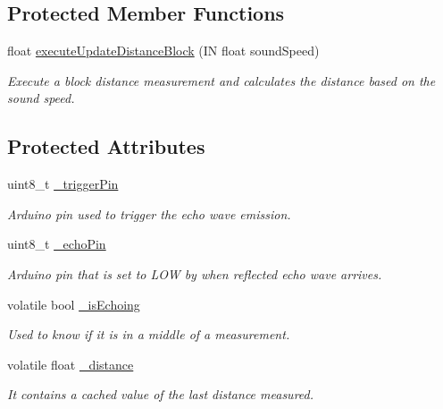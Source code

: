 \subsection*{Protected Member Functions}
\begin{DoxyCompactItemize}
\item 
float \hyperlink{class_easyuino_1_1_distance_meter_a4e02477669d61a3a7afb7deb9c53cf17}{execute\+Update\+Distance\+Block} (IN float sound\+Speed)
\begin{DoxyCompactList}\small\item\em Execute a block distance measurement and calculates the distance based on the sound speed. \end{DoxyCompactList}\end{DoxyCompactItemize}
\subsection*{Protected Attributes}
\begin{DoxyCompactItemize}
\item 
\mbox{\label{class_easyuino_1_1_distance_meter_a39f2305fe998cd3212eef389dfe036fe}} 
uint8\+\_\+t \hyperlink{class_easyuino_1_1_distance_meter_a39f2305fe998cd3212eef389dfe036fe}{\+\_\+trigger\+Pin}
\begin{DoxyCompactList}\small\item\em Arduino pin used to trigger the echo wave emission. \end{DoxyCompactList}\item 
\mbox{\label{class_easyuino_1_1_distance_meter_a6f4a18c48dc147102f1fae8cb12e24a2}} 
uint8\+\_\+t \hyperlink{class_easyuino_1_1_distance_meter_a6f4a18c48dc147102f1fae8cb12e24a2}{\+\_\+echo\+Pin}
\begin{DoxyCompactList}\small\item\em Arduino pin that is set to L\+OW by when reflected echo wave arrives. \end{DoxyCompactList}\item 
\mbox{\label{class_easyuino_1_1_distance_meter_ae2b9e4d3e8704c8f1a73639afd53614d}} 
volatile bool \hyperlink{class_easyuino_1_1_distance_meter_ae2b9e4d3e8704c8f1a73639afd53614d}{\+\_\+is\+Echoing}
\begin{DoxyCompactList}\small\item\em Used to know if it is in a middle of a measurement. \end{DoxyCompactList}\item 
volatile float \hyperlink{class_easyuino_1_1_distance_meter_ae10df1a21d2acfec3aa3eef57ea3a632}{\+\_\+distance}
\begin{DoxyCompactList}\small\item\em It contains a cached value of the last distance measured. \end{DoxyCompactList}\end{DoxyCompactItemize}



